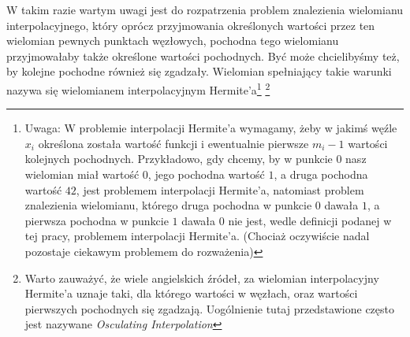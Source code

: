 \documentclass[10pt,wide]{mwart}
\theoremstyle{definition}
\begin{document}
 W takim razie wartym uwagi jest do rozpatrzenia problem znalezienia wielomianu interpolacyjnego, który oprócz przyjmowania określonych wartości przez ten wielomian pewnych punktach węzłowych, pochodna tego wielomianu przyjmowałaby także określone wartości pochodnych. Być może chcielibyśmy też, by kolejne pochodne również się zgadzały.
 Wielomian spełniający takie warunki nazywa się wielomianem interpolacyjnym Hermite'a\footnote{
 Uwaga: W problemie interpolacji Hermite'a wymagamy,
 żeby w jakimś węźle \(x_i\) określona została wartość funkcji i ewentualnie pierwsze \(m_i - 1\) wartości kolejnych pochodnych.
 Przykładowo, gdy chcemy, by w punkcie \(0\) nasz wielomian miał wartość 0, jego pochodna wartość \(1\), a druga pochodna wartość \(42\),
 jest problemem interpolacji Hermite'a, natomiast problem znalezienia wielomianu,
 którego druga pochodna w punkcie \(0\) dawała \(1\), a pierwsza pochodna w punkcie \(1 \) dawała \(0\) nie jest, wedle definicji podanej w tej pracy, problemem interpolacji Hermite'a. (Chociaż oczywiście nadal pozostaje ciekawym problemem do rozważenia)}
 \footnote{Warto zauważyć, że wiele angielskich źródeł, za wielomian interpolacyjny Hermite'a uznaje taki, dla którego wartości w węzłach, oraz wartości pierwszych pochodnych się zgadzają. Uogólnienie tutaj przedstawione często jest nazywane \emph{Osculating Interpolation}}
\end{document}
